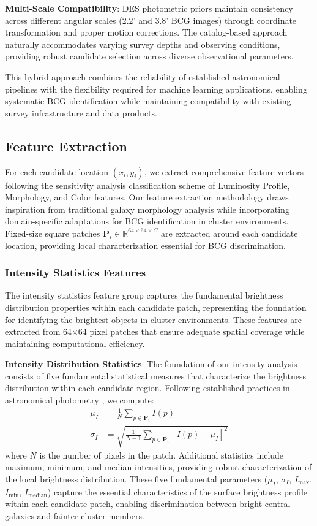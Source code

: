 \documentclass[twocolumn,10pt]{aastex631}
\begin{document}
\textbf{Multi-Scale Compatibility}: DES photometric priors maintain consistency across different angular scales (2.2' and 3.8' BCG images) through coordinate transformation and proper motion corrections. The catalog-based approach naturally accommodates varying survey depths and observing conditions, providing robust candidate selection across diverse observational parameters.

This hybrid approach combines the reliability of established astronomical pipelines with the flexibility required for machine learning applications, enabling systematic BCG identification while maintaining compatibility with existing survey infrastructure and data products.

\subsection{Feature Extraction}

For each candidate location $(x_i, y_i)$, we extract comprehensive feature vectors following the sensitivity analysis classification scheme of Luminosity Profile, Morphology, and Color features. Our feature extraction methodology draws inspiration from traditional galaxy morphology analysis \citep{Conselice2003} while incorporating domain-specific adaptations for BCG identification in cluster environments. Fixed-size square patches $\mathbf{P}_i \in \mathbb{R}^{64 \times 64 \times C}$ are extracted around each candidate location, providing local characterization essential for BCG discrimination.

\subsubsection{Intensity Statistics Features}

The intensity statistics feature group captures the fundamental brightness distribution properties within each candidate patch, representing the foundation for identifying the brightest objects in cluster environments. These features are extracted from 64×64 pixel patches that ensure adequate spatial coverage while maintaining computational efficiency.

\textbf{Intensity Distribution Statistics}: The foundation of our intensity analysis consists of five fundamental statistical measures that characterize the brightness distribution within each candidate region. Following established practices in astronomical photometry \citep{Bertin1996}, we compute:
\begin{align}
\mu_I &= \frac{1}{N} \sum_{p \in \mathbf{P}_i} I(p) \\
\sigma_I &= \sqrt{\frac{1}{N-1} \sum_{p \in \mathbf{P}_i} [I(p) - \mu_I]^2}
\end{align}
where $N$ is the number of pixels in the patch. Additional statistics include maximum, minimum, and median intensities, providing robust characterization of the local brightness distribution. These five fundamental parameters ($\mu_I$, $\sigma_I$, $I_{\max}$, $I_{\min}$, $I_{\text{median}}$) capture the essential characteristics of the surface brightness profile within each candidate patch, enabling discrimination between bright central galaxies and fainter cluster members.
\end{document}
